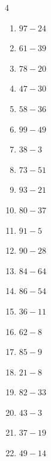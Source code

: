 \begin{multicols}{4}
\begin{enumerate}
  \item $97-24$
        \phantom{$=73$}

  \item $61-39$
        \phantom{$=22$}

  \item $78-20$
        \phantom{$=58$}

  \item $47-30$
        \phantom{$=17$}

  \item $58-36$
        \phantom{$=22$}

  \item $99-49$
        \phantom{$=50$}

  \item $38-3$
        \phantom{$=35$}

  \item $73-51$
        \phantom{$=22$}

  \item $93-21$
        \phantom{$=72$}

  \item $80-37$
        \phantom{$=43$}

  \item $91-5$
        \phantom{$=86$}

  \item $90-28$
        \phantom{$=62$}

  \item $84-64$
        \phantom{$=20$}

  \item $86-54$
        \phantom{$=32$}

  \item $36-11$
        \phantom{$=25$}

  \item $62-8$
        \phantom{$=54$}

  \item $85-9$
        \phantom{$=76$}

  \item $21-8$
        \phantom{$=13$}

  \item $82-33$
        \phantom{$=49$}

  \item $43-3$
        \phantom{$=40$}

  \item $37-19$
        \phantom{$=18$}

  \item $49-14$
        \phantom{$=35$}


\end{enumerate}
\end{multicols}
